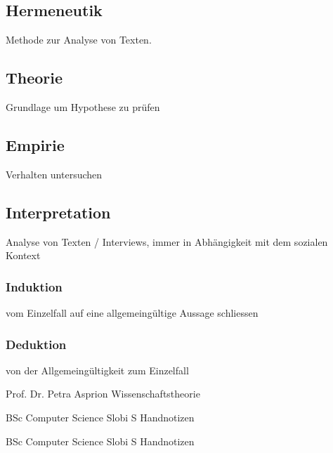 \documentclass[DIV=calc, paper=a4, fontsize=11pt, twocolumn]{scrartcl}	 %
\begin{document}
\subsection*{Hermeneutik}
Methode zur Analyse von Texten.

\subsection*{Theorie}
Grundlage um Hypothese zu pr\"ufen

\subsection*{Empirie}
Verhalten untersuchen

\subsection*{Interpretation}
Analyse von Texten / Interviews, immer in Abhängigkeit mit dem sozialen Kontext

\subsubsection*{Induktion}
vom Einzelfall auf eine allgemeingültige Aussage schliessen

\subsubsection*{Deduktion}
von der Allgemeingültigkeit zum Einzelfall

\begin{thebibliography}{99} %

Prof. Dr. Petra Asprion
\newblock Wissenschaftstheorie
 
BSc Computer Science Slobi S
\newblock Handnotizen

BSc Computer Science Slobi S
\newblock Handnotizen
 
\end{thebibliography}

\end{document}
